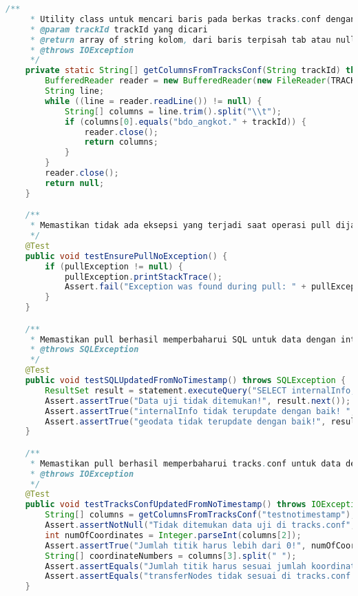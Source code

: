 \begin{lstlisting}[language=Java,basicstyle=\tiny,caption=DataPullerTest.java]
    /**
     * Utility class untuk mencari baris pada berkas tracks.conf dengan trackId tertentu.
     * @param trackId trackId yang dicari
     * @return array of string kolom, dari baris terpisah tab atau null jika tidak ditemukan.
     * @throws IOException 
     */
    private static String[] getColumnsFromTracksConf(String trackId) throws IOException {
        BufferedReader reader = new BufferedReader(new FileReader(TRACKS_CONF_FILE));
        String line;
        while ((line = reader.readLine()) != null) {
            String[] columns = line.trim().split("\\t");
            if (columns[0].equals("bdo_angkot." + trackId)) {
                reader.close();
                return columns;
            }
        }
        reader.close();
        return null;
    }

    /**
     * Memastikan tidak ada eksepsi yang terjadi saat operasi pull dijalankan.
     */
    @Test
    public void testEnsurePullNoException() {
        if (pullException != null) {
            pullException.printStackTrace();
            Assert.fail("Exception was found during pull: " + pullException);
        }
    }

    /**
     * Memastikan pull berhasil memperbaharui SQL untuk data dengan internalInfo berisi 'angkotwebid:nnn' (tanpa timestamp)
     * @throws SQLException
     */
    @Test
    public void testSQLUpdatedFromNoTimestamp() throws SQLException {
        ResultSet result = statement.executeQuery("SELECT internalInfo, AsText(geodata) FROM tracks WHERE trackId='testnotimestamp';");
        Assert.assertTrue("Data uji tidak ditemukan!", result.next());
        Assert.assertTrue("internalInfo tidak terupdate dengan baik! ", result.getString(1).matches("angkotwebid:642:[0-9]+"));
        Assert.assertTrue("geodata tidak terupdate dengan baik!", result.getString(2).matches("LINESTRING(.+)"));
    }

    /**
     * Memastikan pull berhasil memperbaharui tracks.conf untuk data dengan internalInfo berisi 'angkotwebid:nnn' (tanpa timestamp)
     * @throws IOException
     */
    @Test
    public void testTracksConfUpdatedFromNoTimestamp() throws IOException {
        String[] columns = getColumnsFromTracksConf("testnotimestamp");
        Assert.assertNotNull("Tidak ditemukan data uji di tracks.conf", columns);
        int numOfCoordinates = Integer.parseInt(columns[2]);
        Assert.assertTrue("Jumlah titik harus lebih dari 0!", numOfCoordinates > 0);
        String[] coordinateNumbers = columns[3].split(" ");
        Assert.assertEquals("Jumlah titik harus sesuai jumlah koordinat", numOfCoordinates * 2, coordinateNumbers.length);
        Assert.assertEquals("transferNodes tidak sesuai di tracks.conf!", "0-" + (numOfCoordinates - 1), columns[5]);
    }


\end{lstlisting}
